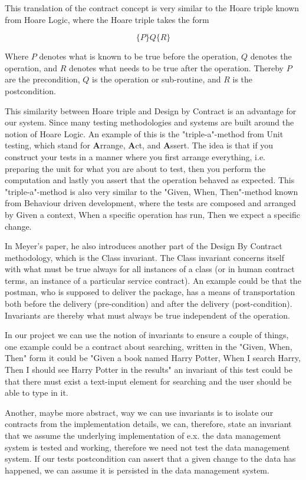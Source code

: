 This translation of the contract concept is very similar to the Hoare triple known from Hoare Logic, where the Hoare triple takes the form

\begin{equation}
\{P\} Q \{R\}
\end{equation}

Where $P$ denotes what is known to be true before the operation, $Q$ denotes the operation, and $R$ denotes what needs to be true after the operation. Thereby $P$ are the precondition, $Q$ is the operation or sub-routine, and $R$ is the postcondition. 

This similarity between Hoare triple and Design by Contract is an advantage for our system. Since many testing methodologies and systems are built around the notion of Hoare Logic. 
An example of this is the "triple-a"-method from Unit testing, which stand for \textbf{A}rrange, \textbf{A}ct, and \textbf{A}ssert.
The idea is that if you construct your tests in a manner where you first arrange everything, i.e. preparing the unit for what you are about to test, then you perform the computation and lastly you assert that the operation behaved as expected. 
This "triple-a"-method is also very similar to the "Given, When, Then"-method known from Behaviour driven development, where the tests are composed and arranged by Given a context, When a specific operation has run, Then we expect a specific change. 

In Meyer's paper, he also introduces another part of the Design By Contract methodology, which is the Class invariant. The Class invariant concerns itself with what must be true always for all instances of a class (or in human contract terms, an instance of a particular service contract). An example could be that the postman, who is supposed to deliver the package, has a means of transportation both before the delivery (pre-condition) and after the delivery (post-condition). Invariants are thereby what must always be true independent of the operation.

In our project we can use the notion of invariants to ensure a couple of things, one example could be a contract about searching, written in the "Given, When, Then" form it could be "Given a book named Harry Potter, When I search Harry, Then I should see Harry Potter in the results" an invariant of this test could be that there must exist a text-input element for searching and the user should be able to type in it.

Another, maybe more abstract, way we can use invariants is to isolate our contracts from the implementation details, we can, therefore, state an invariant that we assume the underlying implementation of e.x. the data management system is tested and working, therefore we need not test the data management system. If our tests postcondition can assert that a given change to the data has happened, we can assume it is persisted in the data management system.

